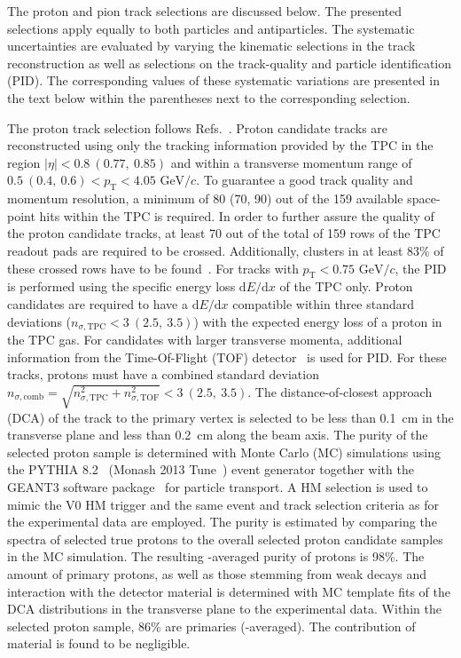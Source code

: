 \documentclass[ALICE,manyauthors]{cernphprep}
\begin{document}
The proton and pion track selections are discussed below. The presented selections apply equally to both particles and antiparticles. The systematic uncertainties are evaluated by varying the kinematic selections in the track reconstruction as well as selections on the track-quality and particle identification (PID). The corresponding values of these systematic variations are presented in the text below within the parentheses next to the corresponding selection.

The proton track selection follows Refs.~\cite{ppSourceErratum,ALICE:2018ysd, ALICE:ppp-ppL}. Proton candidate tracks are reconstructed using only the tracking information provided by the TPC in the region $|\eta| < 0.8~(0.77,~0.85)$ and within a transverse momentum range of $ 0.5~(0.4,~0.6) < p_\text{T} < 4.05 \text{ GeV}/c$. To guarantee a good track quality and momentum resolution, a minimum of 80 (70, 90) out of the 159 available space-point hits within the TPC is required. In order to further assure the quality of the proton candidate tracks, at least 70 out of the total of 159
rows of the TPC readout pads are required to be crossed. Additionally, clusters in at least 83\% of these crossed rows have to be found~\cite{ALICE:2018ysd}. For tracks with $p_\text{T} < 0.75 \text{ GeV}/c$, the PID is performed using the specific energy loss $\text{d}E/\text{d}x$ of the TPC only. Proton candidates are required to have a $\text{d}E/\text{d}x$ compatible within three standard deviations ($n_{\sigma,\text{TPC}} < 3~(2.5,~3.5)$) with the expected energy loss of a proton in the TPC gas. For candidates with larger transverse momenta, additional information from the Time-Of-Flight (TOF) detector~\cite{Akindinov:2013tea} is used for PID. For these tracks, protons must have a combined standard deviation $n_{\sigma, \text{comb}} = \sqrt{n_{\sigma,\text{TPC}}^2 + n_{\sigma,\text{TOF}}^2} < 3~(2.5,~3.5)$. The distance-of-closest approach (DCA) of the track to the primary vertex is selected to be less than 0.1~cm in the transverse plane and less than 0.2~cm along the beam axis. The purity of the selected proton sample is determined with Monte Carlo (MC) simulations using the  PYTHIA 8.2~\cite{Sjostrand:2014zea} (Monash 2013 Tune~\cite{Skands:2014pea}) event generator together with the GEANT3 software package~\cite{GEANT3} for particle transport. A HM selection is used to mimic the V0 HM trigger and the same event and track selection criteria as for the experimental data are employed. The purity is estimated by comparing the \ptText{} spectra of selected true protons to the overall selected proton candidate samples in the MC simulation. The resulting \ptText-averaged purity of protons is 98\%. The amount of primary protons, as well as those stemming from weak decays and interaction with the detector material is determined with MC template fits of the DCA distributions in the transverse plane to the experimental data. Within the selected proton sample, 86\% are primaries (\ptText-averaged). The contribution of material is found to be negligible.
\end{document}
